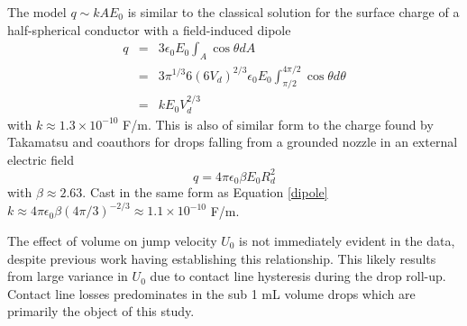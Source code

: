 \documentclass[12pt,a4paper,oneside]{book}
\begin{document}
The model $q \sim kAE_0$ is similar to the classical solution for the surface charge of a half-spherical conductor with a field-induced dipole\cite{david_j._griffiths_introduction_1999}
\begin{eqnarray}
q &=& 3 \epsilon_0 E_0 \int_A \cos \theta dA \nonumber \\
&=& 3 \pi^{1/3} 6 \left(6 V_d \right)^{2/3} \epsilon_0 E_0 \int^{4 \pi/2}_{\pi / 2} \cos \theta d\theta \nonumber \\
&=& k E_0 V_d^{2/3} \label{dipole}
\end{eqnarray}
with $k \approx 1.3 \times 10^{-10}$ F/m. This is also of similar form to the charge found by Takamatsu and coauthors for drops falling from a grounded nozzle in an external electric field\cite{takamatsu_theoretical_1981}
\[q = 4 \pi \epsilon_0 \beta E_0 R_d^2 \]
with $\beta \approx 2.63$. Cast in the same form as Equation \ref{dipole} $k \approx 4 \pi \epsilon_0 \beta (4 \pi/3)^{-2/3} \approx 1.1 \times 10^{-10}$ F/m.

The effect of volume on jump velocity $U_0$ is not immediately evident in the data, despite previous work having establishing this relationship\cite{attari_puddle_2016}. This likely results from large variance in $U_0$ due to contact line hysteresis during the drop roll-up. Contact line losses predominates in the sub 1 mL volume drops which are primarily the object of this study.  
\end{document}
